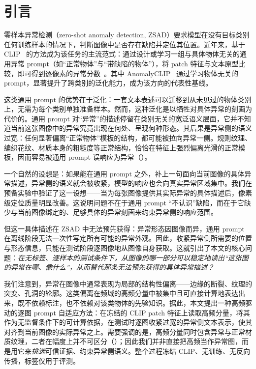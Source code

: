 \section{引言}
\label{sec:intro}



零样本异常检测（zero-shot anomaly detection, ZSAD）要求模型在没有目标类别任何训练样本的情况下，判断图像中是否存在缺陷并定位其位置。近年来，基于 CLIP~\cite{radford2021clip} 的方法成为该任务的主流范式：通过设计或学习一组与具体物体无关的通用异常 prompt（如“正常物体”与“带缺陷的物体”），将 patch 特征与文本原型比较，即可得到逐像素的异常分数~\cite{jeong2023winclip,zhou2024anomalyclip}。其中 AnomalyCLIP~\cite{zhou2024anomalyclip} 通过学习物体无关的 prompt，显著提升了跨类别的泛化能力，成为该方向的代表性基线。

这类通用 prompt 的优势在于泛化：一套文本表述可以迁移到从未见过的物体类别上，无需为每个类别单独准备样本。然而，这种泛化是以牺牲对具体异常的刻画为代价的。通用 prompt 对“异常”的描述停留在类别无关的宽泛语义层面，它并不知道当前这张图像中的异常究竟出现在何处、呈现何种形态。其后果是异常侧的语义过宽：任何显著偏离“正常物体”模板的结构，都可能被拉向异常一侧。规则纹理、编织花纹、材质本身的粗糙度等正常结构，恰恰在特征上强烈偏离光滑的正常模板，因而容易被通用 prompt 误响应为异常（）。

一个自然的设想是：如果能在通用 prompt 之外，补上一句面向当前图像的具体异常描述，异常侧的语义就会被收紧，模型的响应也会向真实异常区域集中。我们在预备实验中验证了这一设想——当为每张图像提供其实际异常的具体描述后，像素级定位质量明显改善。这说明问题不在于通用 prompt “不认识”缺陷，而在于它缺少与当前图像绑定的、足够具体的异常刻画来约束异常侧的响应范围。

但这一具体描述在 ZSAD 中无法预先获得：异常形态因图像而异，通用 prompt 在离线阶段无法一次性写定所有可能的异常外观。因此，收紧异常侧所需要的位置与形态信息，只能在测试阶段逐图像地从图像自身获取。这就引出了本文的核心问题：\emph{在无标签、逐样本的测试条件下，从图像的哪一部分可以稳定地读出“这张图的异常在哪、像什么”，从而替代那条无法预先获得的具体异常描述？}

我们注意到，异常在图像中通常表现为局部的结构性偏离——边缘的断裂、纹理的突变、孔洞的轮廓。这类偏离在频域的高频分量中被集中且可直接计算地表达出来，既不依赖标注，也不依赖对该类物体的先验知识。据此，本文提出一种高频驱动的逐图 prompt 自适应方法：在冻结的 CLIP patch 特征上读取高频分量，将其作为无监督条件下的可计算依据，在测试时逐图收紧过宽的异常侧文本表示，使其对齐到当前图像的实际异常之上。需要强调的是，高频分量同时包含异常与正常材质纹理，二者在幅度上并不可区分（）；因此我们并非直接把高频当作异常图，而是用它来\emph{挑选}可信证据、约束异常侧语义。整个过程冻结 CLIP、无训练、无反向传播，标签仅用于评测。

